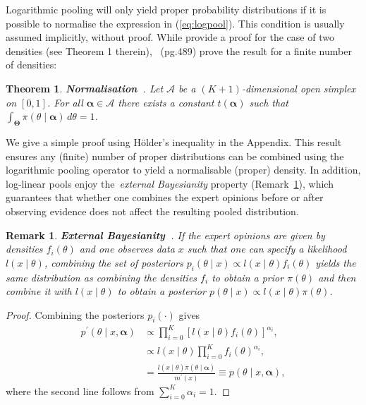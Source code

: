 \documentclass[a4paper, notitlepage, 11pt]{article}
\newtheorem{theo}{Theorem}[]
\newtheorem{remark}{Remark}[]
\begin{document}
Logarithmic pooling will only yield proper probability distributions if it is possible to normalise the expression in (\ref{eq:logpool}).
This condition is usually assumed implicitly, without proof.
While \citet{Poole2000} provide a proof for the case of two densities (see Theorem 1 therein),~\cite{Genest1986A} (pg.489) prove the result for a finite number of densities:
\begin{theo}
\label{thm:normalisation}
\textbf{Normalisation~\citep{Genest1986A}}. 
Let $\mathcal{A}$ be a $(K+1)$-dimensional open simplex on $[0,1]$.
For all $\boldsymbol\alpha \in \mathcal{A}$ there exists a constant $t(\boldsymbol\alpha)$ such that $\int_{\boldsymbol\Theta}\pi(\theta \mid \boldsymbol \alpha)\, d\theta = 1$.
\end{theo}
We give a simple proof using H\"{o}lder's inequality in the Appendix.
This result ensures any (finite) number of proper distributions can be combined using the logarithmic pooling operator to yield a normalisable (proper) density.
In addition, log-linear pools enjoy the~\textit{external Bayesianity} property (Remark~\ref{rmk:properties_EB}), which guarantees that whether one combines the expert opinions before or after observing evidence does not affect the resulting pooled distribution.
\begin{remark}
\label{rmk:properties_EB}
 \textbf{External Bayesianity~\citep{Genest1984}}.
 If the expert opinions are given by densities $f_i(\theta)$ and one observes data $x$ such that one can specify a likelihood $l(x \mid \theta)$, combining the set of posteriors $p_i(\theta \mid x) \propto  l(x \mid \theta)f_i(\theta) $ yields the same distribution as combining the densities $f_i$ to obtain a prior $\pi(\theta)$ and then combine it with $l(x \mid \theta)$ to obtain a posterior $p(\theta \mid x) \propto l(x \mid \theta)\pi(\theta)$.
\end{remark}
\begin{proof}
 Combining the posteriors $p_i(\cdot)$ gives
 \begin{align*}
  p^\prime (\theta \mid x, \boldsymbol \alpha) &\propto \prod_{i = 0}^K \left[  l(x \mid \theta)f_i(\theta) \right]^{\alpha_i},\\
  &\propto   l(x \mid \theta) \prod_{i = 0}^K f_i(\theta)^{\alpha_i},\\
  &=  \frac{l(x \mid \theta)\pi(\theta \mid \boldsymbol \alpha)}{m^{\prime}(x)} \equiv   p(\theta \mid x, \boldsymbol \alpha),
 \end{align*}
 where the second line follows from $\sum_{i=0}^K \alpha_i = 1$.
\end{proof}
\end{document}
